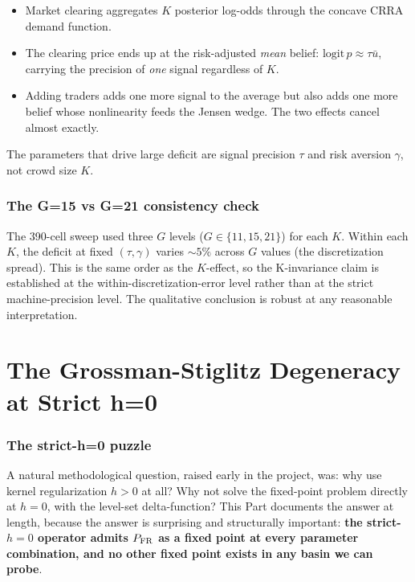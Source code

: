 \documentclass[11pt]{article}
\newcommand{\1}{\mathbf{1}}
\newcommand{\PFR}{P_{\rm FR}}
\begin{document}
\begin{itemize}
\item Market clearing aggregates $K$ posterior log-odds through the
concave CRRA demand function.
\item The clearing price ends up at the risk-adjusted \emph{mean}
belief: $\mathrm{logit}\,p \approx \tau \bar u$, carrying the precision
of \emph{one} signal regardless of $K$.
\item Adding traders adds one more signal to the average but also adds
one more belief whose nonlinearity feeds the Jensen wedge.  The two
effects cancel almost exactly.
\end{itemize}

The parameters that drive large deficit are signal precision $\tau$ and
risk aversion $\gamma$, not crowd size $K$.

\section{The G=15 vs G=21 consistency check}

The 390-cell sweep used three $G$ levels ($G \in \{11, 15, 21\}$) for
each $K$.  Within each $K$, the deficit at fixed $(\tau, \gamma)$
varies $\sim 5\%$ across $G$ values (the discretization spread).  This
is the same order as the $K$-effect, so the K-invariance claim is
established at the within-discretization-error level rather than at
the strict machine-precision level.  The qualitative conclusion is
robust at any reasonable interpretation.

\part{The Grossman-Stiglitz Degeneracy at Strict h=0}

\section{The strict-h=0 puzzle}

A natural methodological question, raised early in the project, was:
why use kernel regularization $h > 0$ at all?  Why not solve the
fixed-point problem directly at $h = 0$, with the level-set
delta-function?  This Part documents the answer at length, because the
answer is surprising and structurally important: \textbf{the strict-$h=0$
operator admits $\PFR$ as a fixed point at every parameter combination,
and no other fixed point exists in any basin we can probe}.
\end{document}
